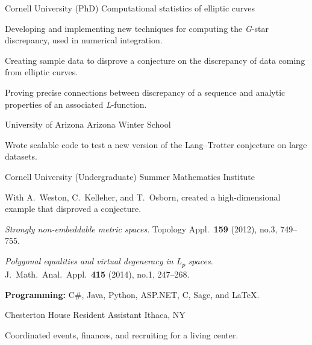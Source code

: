 \documentclass[11pt, letterpaper]{awesome-cv}
\begin{document}

\begin{cventries}

\cventry
	{Cornell University (PhD)}
	{Computational statistics of elliptic curves}
	{}
	{}
	{
		\begin{cvitems}
			\item{Developing and implementing new techniques for computing the \emph{G}-star discrepancy, used in numerical integration.}
			\item{Creating sample data to disprove a conjecture on the discrepancy of data coming from elliptic curves.}
			\item{Proving precise connections between discrepancy of a sequence and analytic properties of an associated \emph{L}-function.}
		\end{cvitems}
	}
		
\cventry
	{University of Arizona}
	{Arizona Winter School}
	{}
	{}
	{
		\begin{cvitems}
			\item{Wrote scalable code to test a new version of the Lang--Trotter conjecture on large datasets.}
		\end{cvitems}
	}
	
\cventry
	{Cornell University (Undergraduate)}
	{Summer Mathematics Institute}
	{}
	{}
	{
		\begin{cvitems}
			\item{With A.~Weston, C.~Kelleher, and T.~Osborn, created a high-dimensional example that disproved a conjecture.}
			\item{\emph{Strongly non-embeddable metric spaces}. Topology Appl.~\textbf{159} (2012), no.3, 749--755.}
			\item{\emph{Polygonal equalities and virtual degeneracy in L\textsubscript{p} spaces}. J.~Math.~Anal.~Appl.~\textbf{415} (2014), no.1, 247--268.}
		\end{cvitems}
	}
	
\end{cventries}






\begin{cvparagraph}

\textbf{Programming:} C\#, Java, Python, ASP.NET, C, Sage, and \LaTeX.
\end{cvparagraph}

\begin{cventries}
\cventry
	{Chesterton House}
	{Resident Assistant}
	{Ithaca, NY}
	{}
	{
		\begin{cvitems}
			\item{Coordinated events, finances, and recruiting for a living center.}
		\end{cvitems}
	}
	
\end{cventries}
\end{document}
